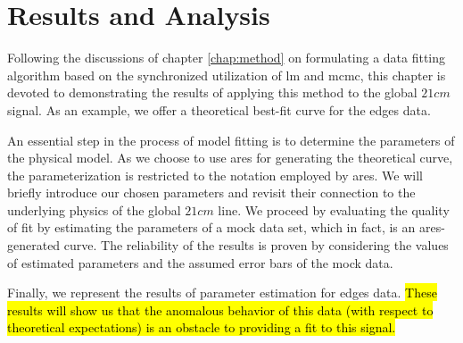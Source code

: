 \documentclass[12pt, TexShade, letterpaper]{report}
\begin{document}
\chapter{Results and Analysis}
\label{chap:results}
Following the discussions of chapter \ref{chap:method} on formulating a data fitting algorithm based on the synchronized utilization of \gls{lm} and \gls{mcmc}, this chapter is devoted to demonstrating the results of applying this method to the global $21cm$ signal. As an example, we offer a theoretical best-fit curve for the \gls{edges} data. \par
An essential step in the process of model fitting is to determine the parameters of the physical model. As we choose to use \gls{ares} for generating the theoretical curve, the parameterization is restricted to the notation employed by \gls{ares}. We will briefly introduce our chosen parameters and revisit their connection to the underlying physics of the global $21cm$ line. We proceed by evaluating the quality of fit by estimating the parameters of a mock data set, which in fact, is an \gls{ares}-generated curve. The reliability of the results is proven by considering the values of estimated parameters and the assumed error bars of the mock data. \par
Finally, we represent the results of parameter estimation for \gls{edges} data. \hl{These results will show us that the anomalous behavior of this data (with respect to theoretical expectations) is an obstacle to providing a fit to this signal.}\par
\end{document}
